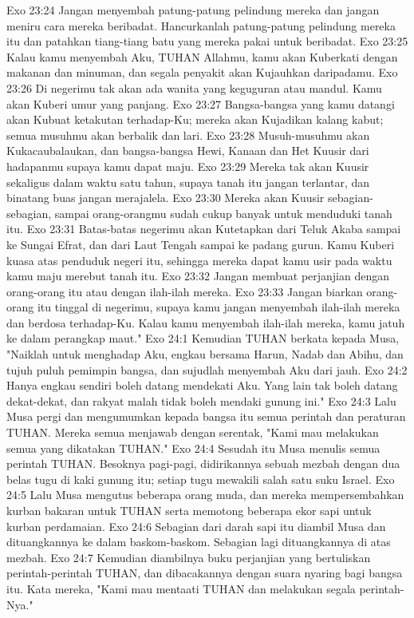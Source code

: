Exo 23:24  Jangan menyembah patung-patung pelindung mereka dan jangan meniru cara mereka beribadat. Hancurkanlah patung-patung pelindung mereka itu dan patahkan tiang-tiang batu yang mereka pakai untuk beribadat.
Exo 23:25  Kalau kamu menyembah Aku, TUHAN Allahmu, kamu akan Kuberkati dengan makanan dan minuman, dan segala penyakit akan Kujauhkan daripadamu.
Exo 23:26  Di negerimu tak akan ada wanita yang keguguran atau mandul. Kamu akan Kuberi umur yang panjang.
Exo 23:27  Bangsa-bangsa yang kamu datangi akan Kubuat ketakutan terhadap-Ku; mereka akan Kujadikan kalang kabut; semua musuhmu akan berbalik dan lari.
Exo 23:28  Musuh-musuhmu akan Kukacaubalaukan, dan bangsa-bangsa Hewi, Kanaan dan Het Kuusir dari hadapanmu supaya kamu dapat maju.
Exo 23:29  Mereka tak akan Kuusir sekaligus dalam waktu satu tahun, supaya tanah itu jangan terlantar, dan binatang buas jangan merajalela.
Exo 23:30  Mereka akan Kuusir sebagian-sebagian, sampai orang-orangmu sudah cukup banyak untuk menduduki tanah itu.
Exo 23:31  Batas-batas negerimu akan Kutetapkan dari Teluk Akaba sampai ke Sungai Efrat, dan dari Laut Tengah sampai ke padang gurun. Kamu Kuberi kuasa atas penduduk negeri itu, sehingga mereka dapat kamu usir pada waktu kamu maju merebut tanah itu.
Exo 23:32  Jangan membuat perjanjian dengan orang-orang itu atau dengan ilah-ilah mereka.
Exo 23:33  Jangan biarkan orang-orang itu tinggal di negerimu, supaya kamu jangan menyembah ilah-ilah mereka dan berdosa terhadap-Ku. Kalau kamu menyembah ilah-ilah mereka, kamu jatuh ke dalam perangkap maut."
Exo 24:1  Kemudian TUHAN berkata kepada Musa, "Naiklah untuk menghadap Aku, engkau bersama Harun, Nadab dan Abihu, dan tujuh puluh pemimpin bangsa, dan sujudlah menyembah Aku dari jauh.
Exo 24:2  Hanya engkau sendiri boleh datang mendekati Aku. Yang lain tak boleh datang dekat-dekat, dan rakyat malah tidak boleh mendaki gunung ini."
Exo 24:3  Lalu Musa pergi dan mengumumkan kepada bangsa itu semua perintah dan peraturan TUHAN. Mereka semua menjawab dengan serentak, "Kami mau melakukan semua yang dikatakan TUHAN."
Exo 24:4  Sesudah itu Musa menulis semua perintah TUHAN. Besoknya pagi-pagi, didirikannya sebuah mezbah dengan dua belas tugu di kaki gunung itu; setiap tugu mewakili salah satu suku Israel.
Exo 24:5  Lalu Musa mengutus beberapa orang muda, dan mereka mempersembahkan kurban bakaran untuk TUHAN serta memotong beberapa ekor sapi untuk kurban perdamaian.
Exo 24:6  Sebagian dari darah sapi itu diambil Musa dan dituangkannya ke dalam baskom-baskom. Sebagian lagi dituangkannya di atas mezbah.
Exo 24:7  Kemudian diambilnya buku perjanjian yang bertuliskan perintah-perintah TUHAN, dan dibacakannya dengan suara nyaring bagi bangsa itu. Kata mereka, "Kami mau mentaati TUHAN dan melakukan segala perintah-Nya."
